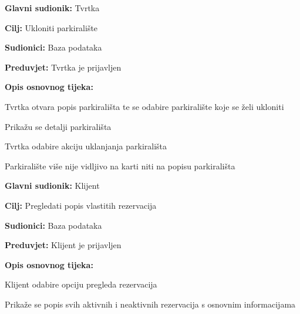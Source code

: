 \noindent {}
\begin{packed_item}
	
	\item \textbf{Glavni sudionik:} Tvrtka
	\item \textbf{Cilj:} Ukloniti parkiralište
	\item \textbf{Sudionici:} Baza podataka
	\item \textbf{Preduvjet:} Tvrtka je prijavljen
	\item \textbf{Opis osnovnog tijeka:}
	
	\item[] \begin{packed_enum}
		
		\item Tvrtka otvara popis parkirališta te se odabire parkiralište koje se želi ukloniti
		\item Prikažu se detalji parkirališta
		\item Tvrtka odabire akciju uklanjanja parkirališta
		\item Parkiralište više nije vidljivo na karti niti na popisu parkirališta

	\end{packed_enum}
\end{packed_item}

\pagebreak

\noindent {}
\begin{packed_item}
	
	\item \textbf{Glavni sudionik: } Klijent
	\item \textbf{Cilj:} Pregledati popis vlastitih rezervacija
	\item \textbf{Sudionici:} Baza podataka
	\item \textbf{Preduvjet:} Klijent je prijavljen
	\item \textbf{Opis osnovnog tijeka:}
	
	\item[] \begin{packed_enum}
		
		\item Klijent odabire opciju pregleda rezervacija
		\item Prikaže se popis svih aktivnih i neaktivnih rezervacija s osnovnim informacijama

	\end{packed_enum}
\end{packed_item}

